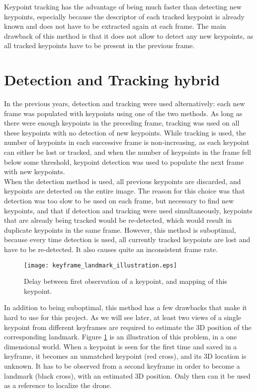 Keypoint tracking has the advantage of being much faster than detecting new keypoints, especially because the descriptor of each tracked keypoint is already known and does not have to be extracted again at each frame. The main drawback of this method is that it does not allow to detect any new keypoints, as all tracked keypoints have to be present in the previous frame.

\section{Detection and Tracking hybrid}

In the previous years, detection and tracking were used alternatively: each new frame was populated with keypoints using one of the two methods. As long as there were enough keypoints in the preceding frame, tracking was used on all these keypoints with no detection of new keypoints. While tracking is used, the number of keypoints in each successive frame is non-increasing, as each keypoint can either be lost or tracked, and when the number of keypoints in the frame fell below some threshold, keypoint detection was used to populate the next frame with new keypoints.\\

When the detection method is used, all previous keypoints are discarded, and keypoints are detected on the entire image. The reason for this choice was that detection was too slow to be used on each frame, but necessary to find new keypoints, and that if detection and tracking were used simultaneously, keypoints that are already being tracked would be re-detected, which would result in duplicate keypoints in the same frame. However, this method is suboptimal, because every time detection is used, all currently tracked keypoints are lost and have to be re-detected. It also causes quite an inconsistent frame rate.\\

\begin{figure}[H]
  \centering
  \texttt{[image: keyframe\_landmark\_illustration.eps]}
  \caption{Delay between first observation of a keypoint, and mapping of this keypoint.}
  \label{fig:delay}
\end{figure}

In addition to being suboptimal, this method has a few drawbacks that make it hard to use for this project. As we will see later, at least two views of a single keypoint from different keyframes are required to estimate the 3D position of the corresponding landmark. Figure \ref{fig:delay} is an illustration of this problem, in a one dimensional world. When a keypoint is seen for the first time and saved in a keyframe, it becomes an unmatched keypoint (red cross), and its 3D location is unknown. It has to be observed from a second keyframe in order to become a landmark (black cross), with an estimated 3D position. Only then can it be used as a reference to localize the drone.\\

